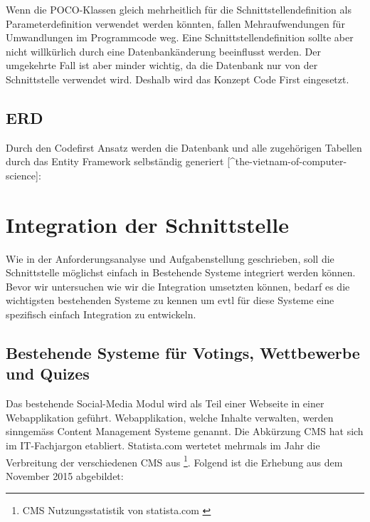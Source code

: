 Wenn die POCO-Klassen gleich mehrheitlich für die
Schnittstellendefinition als Parameterdefinition verwendet werden
könnten, fallen Mehraufwendungen für Umwandlungen im Programmcode weg.
Eine Schnittstellendefinition sollte aber nicht willkürlich durch eine
Datenbankänderung beeinflusst werden. Der umgekehrte Fall ist aber
minder wichtig, da die Datenbank nur von der Schnittstelle verwendet
wird. Deshalb wird das Konzept Code First eingesetzt.

\subsection{ERD}\label{erd}

Durch den Codefirst Ansatz werden die Datenbank und alle zugehörigen
Tabellen durch das Entity Framework selbständig generiert
{[}\^{}the-vietnam-of-computer-science{]}:
\autocite{the-vietnam-of-computer-science}

\section{Integration der
Schnittstelle}\label{integration-der-schnittstelle}

Wie in der Anforderungsanalyse und Aufgabenstellung geschrieben, soll
die Schnittstelle möglichst einfach in Bestehende Systeme integriert
werden können. Bevor wir untersuchen wie wir die Integration umsetzten
können, bedarf es die wichtigsten bestehenden Systeme zu kennen um evtl
für diese Systeme eine spezifisch einfach Integration zu entwickeln.

\subsection{Bestehende Systeme für Votings, Wettbewerbe und
Quizes}\label{bestehende-systeme-fuxfcr-votings-wettbewerbe-und-quizes}

Das bestehende Social-Media Modul wird als Teil einer Webseite in einer
Webapplikation geführt. Webapplikation, welche Inhalte verwalten, werden
sinngemäss Content Management Systeme genannt. Die Abkürzung CMS hat
sich im IT-Fachjargon etabliert. Statista.com wertetet mehrmals im Jahr
die Verbreitung der verschiedenen CMS aus \footnote{CMS
  Nutzungsstatistik von statista.com \autocite{statisticinfostatista}}.
Folgend ist die Erhebung aus dem November 2015 abgebildet:

